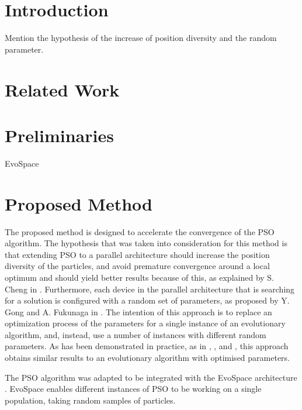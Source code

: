 \documentclass[runningheads,a4paper]{llncs}
\begin{document}
\begin{abstract}

\end{abstract}


\section{Introduction}
\label{introduction}

Mention the hypothesis of the increase of position diversity and the random parameter.

\section{Related Work}
\label{related-work}

\section{Preliminaries}
\label{preliminaries}

EvoSpace

\section{Proposed Method}
\label{proposed-method}

The proposed method is designed to accelerate the convergence of the
PSO algorithm. The hypothesis that was taken into consideration for this method is
that extending PSO to a parallel architecture should increase the
position diversity of the particles, and avoid premature convergence around a local
optimum and should yield better results because of this, as explained
by S. Cheng in \cite{cheng2013population}. Furthermore, each device in the parallel
architecture that is searching for a solution is configured with a
random set of parameters, as proposed by Y. Gong and
A. Fukunaga in \cite{gong2011distributed}. The intention of this approach is to
replace an optimization process of the parameters for a single instance of
an evolutionary algorithm, and, instead, use a number of instances with
different random parameters. As has been demonstrated in practice, as
in \cite{garcia2014randomized}, \cite{gong2011distributed}, and
\cite{tanabe2013evaluation}, this approach obtains similar results to
an evolutionary algorithm with optimised parameters.

The PSO algorithm was adapted to be integrated with the EvoSpace
architecture \cite{garcia2015evospace}. EvoSpace enables different
instances of PSO to be working on a single population, taking random
samples of particles.
\end{document}
